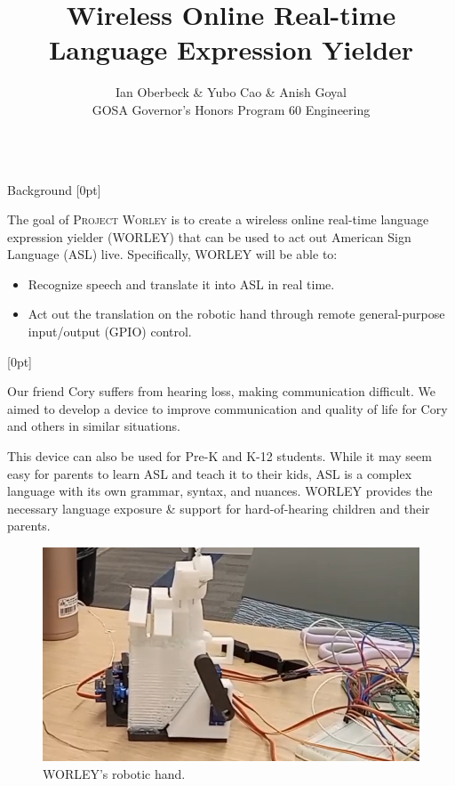 \documentclass[final, 16pt]{beamer}
\title{Wireless Online Real-time Language Expression Yielder}
\author{Ian Oberbeck \& Yubo Cao \& Anish Goyal \\\normalfont GOSA Governor's Honors Program 60 Engineering}
\newlength{\colwidth}
\begin{document}
\begin{frame}[t]
\centering
\begin{columns}[t]
\margincolumn

\fontsize{22}{26}\selectfont

\begin{column}{\colwidth}
  \fontsize{22}{24}\selectfont
  \begin{block}{Background}
    [0pt]

    The goal of \textsc{Project Worley} is to create a wireless online real-time language expression yielder (WORLEY) that can be used to act out American Sign Language (ASL) live. Specifically, WORLEY will be able to:

    \begin{itemize}
      \item Recognize speech and translate it into ASL in real time.
      \item Act out the translation on the robotic hand through remote general-purpose input/output (GPIO) control.
    \end{itemize}

    [0pt]

    Our friend Cory suffers from hearing loss, making communication difficult. We aimed to develop a device to improve communication and quality of life for Cory and others in similar situations.

    This device can also be used for Pre-K and K-12 students.  While it may seem easy for parents to learn ASL and teach it to their kids, ASL is a complex language with its own grammar, syntax, and nuances. WORLEY provides the necessary language exposure \& support for hard-of-hearing children and their parents.
  \end{block}

  \begin{figure}
    \centering
    \includegraphics[width=0.75\linewidth]{images/hand.png}
    \caption{WORLEY's robotic hand.}
    \label{fig:hand}
  \end{figure}


\end{column}
\end{columns}
\end{frame}
\end{document}
